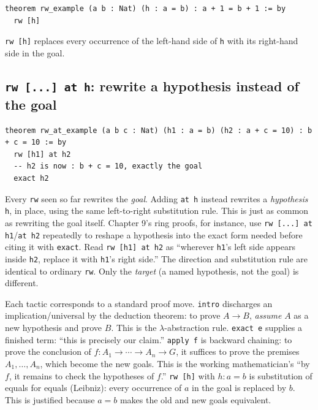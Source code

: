 \begin{lstlisting}
theorem rw_example (a b : Nat) (h : a = b) : a + 1 = b + 1 := by
  rw [h]
\end{lstlisting}

\texttt{rw [h]} replaces every occurrence of the left-hand side of \texttt{h} with its right-hand side in the goal.

\subsection{\texorpdfstring{\texttt{rw\ {[}...{]}\ at\ h}: rewrite a hypothesis instead of the goal}{rw {[}...{]} at h: rewrite a hypothesis instead of the goal}}\label{sec:04-tactics:02-core-tactics:6}

\begin{lstlisting}
theorem rw_at_example (a b c : Nat) (h1 : a = b) (h2 : a + c = 10) : b + c = 10 := by
  rw [h1] at h2
  -- h2 is now : b + c = 10, exactly the goal
  exact h2
\end{lstlisting}

Every \texttt{rw} seen so far rewrites the \emph{goal}. Adding \texttt{at h} instead rewrites a \emph{hypothesis} \texttt{h}, in place, using the same left-to-right substitution rule. This is just as common as rewriting the goal itself. Chapter 9's ring proofs, for instance, use \texttt{rw [...] at h1}/\texttt{at h2} repeatedly to reshape a hypothesis into the exact form needed before citing it with \texttt{exact}. Read \texttt{rw [h1] at h2} as ``wherever \texttt{h1}'s left side appears inside \texttt{h2}, replace it with \texttt{h1}'s right side.'' The direction and substitution rule are identical to ordinary \texttt{rw}. Only the \emph{target} (a named hypothesis, not the goal) is different.

\begin{mathreading}

Each tactic corresponds to a standard proof move. \texttt{intro} discharges an implication/universal by the deduction theorem: to prove \(A \to B\), \emph{assume} \(A\) as a new hypothesis and prove \(B\). This is the \(\lambda\)-abstraction rule. \texttt{exact e} supplies a finished term: ``this is precisely our claim.'' \texttt{apply f} is backward chaining: to prove the conclusion of \(f : A_1 \to \cdots \to A_n \to G\), it suffices to prove the premises \(A_1, \ldots, A_n\), which become the new goals. This is the working mathematician's ``by \(f\), it remains to check the hypotheses of \(f\).'' \texttt{rw [h]} with \(h : a = b\) is substitution of equals for equals (Leibniz): every occurrence of \(a\) in the goal is replaced by \(b\). This is justified because \(a = b\) makes the old and new goals equivalent.

\end{mathreading}


